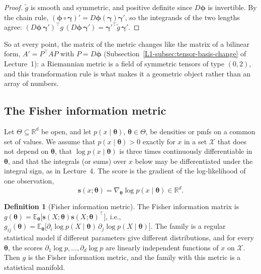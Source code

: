 \documentclass[11pt]{article}
\newcommand{\E}{\mathbb{E}}
\theoremstyle{definition}
\newtheorem{definition}{Definition}[section]
\theoremstyle{plain}
\theoremstyle{remark}
\begin{document}
\begin{proof}
    $\tilde g$ is smooth and symmetric, and positive definite since $D\boldsymbol{\phi}$ is invertible. By the chain rule, $(\boldsymbol{\phi} \circ \boldsymbol{\gamma})' = D\boldsymbol{\phi}(\boldsymbol{\gamma})\boldsymbol{\gamma}'$, so the integrands of the two lengths agree: $(D\boldsymbol{\phi}\,\boldsymbol{\gamma}')^\top g\,(D\boldsymbol{\phi}\,\boldsymbol{\gamma}') = \boldsymbol{\gamma}'^\top\tilde g\,\boldsymbol{\gamma}'$.
\end{proof}

So at every point, the matrix of the metric changes like the matrix of a bilinear form, $A' = P^\top AP$ with $P = D\boldsymbol{\phi}$ (Subsection~\ref{L1-subsec:tensor-basis-change} of Lecture~1): a Riemannian metric is a field of symmetric tensors of type $(0, 2)$, and this transformation rule is what makes it a geometric object rather than an array of numbers.

\subsection{The Fisher information metric}

Let $\Theta \subseteq \mathbb{R}^d$ be open, and let $p(x \mid \boldsymbol{\theta})$, $\boldsymbol{\theta} \in \Theta$, be densities or pmfs on a common set of values. We assume that $p(x \mid \boldsymbol{\theta}) > 0$ exactly for $x$ in a set $\mathcal{X}$ that does not depend on $\boldsymbol{\theta}$, that $\log p(x \mid \boldsymbol{\theta})$ is three times continuously differentiable in $\boldsymbol{\theta}$, and that the integrals (or sums) over $x$ below may be differentiated under the integral sign, as in Lecture~4. The score is the gradient of the log-likelihood of one observation,
\[\mathbf{s}(x; \boldsymbol{\theta}) = \nabla_{\boldsymbol{\theta}}\log p(x \mid \boldsymbol{\theta}) \in \mathbb{R}^d.\]

\begin{definition}[Fisher information metric]\label{def:fisher-metric}
    The Fisher information matrix is $g(\boldsymbol{\theta}) = \E_{\boldsymbol{\theta}}\big[\mathbf{s}(X; \boldsymbol{\theta})\mathbf{s}(X; \boldsymbol{\theta})^\top\big]$, i.e., $g_{ij}(\boldsymbol{\theta}) = \E_{\boldsymbol{\theta}}\big[\partial_i\log p(X \mid \boldsymbol{\theta})\,\partial_j\log p(X \mid \boldsymbol{\theta})\big]$. The family is a regular statistical model if different parameters give different distributions, and for every $\boldsymbol{\theta}$, the scores $\partial_1\log p, \ldots, \partial_d\log p$ are linearly independent functions of $x$ on $\mathcal{X}$. Then $g$ is the Fisher information metric, and the family with this metric is a statistical manifold.
\end{definition}
\end{document}
